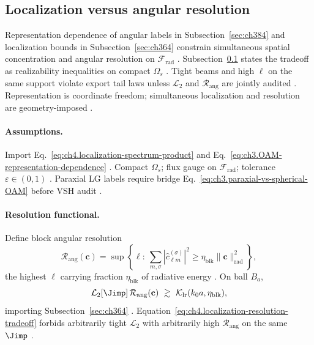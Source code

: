 ﻿\subsection{Localization versus angular resolution}
\label{sec:ch474}

Representation dependence of angular labels in Subsection~\ref{sec:ch384} and localization bounds in Subsection~\ref{sec:ch364} constrain
simultaneous spatial concentration and angular resolution on \(\mathcal{F}_{\mathrm{rad}}\) \cite{harrington2001,hansen1988,stratton1941}.
Subsection~\ref{sec:ch474} states the tradeoff as realizability inequalities on compact \(\Omega_{s}\) \cite{devaney2004,jackson1999}. Tight beams
and high \(\ell\) on the same support violate export tail laws unless \(\mathcal{L}_{2}\) and \(\mathcal{R}_{\mathrm{ang}}\) are jointly audited
\cite{hansen1988,harrington2001}. Representation is coordinate freedom; simultaneous localization and resolution are geometry-imposed
\cite{stratton1941,devaney2004}.

\paragraph{Assumptions.}
Import Eq.~\eqref{eq:ch4.localization-spectrum-product} and Eq.~\eqref{eq:ch3.OAM-representation-dependence} \cite{stratton1941,hansen1988,harrington2001}.
Compact \(\Omega_{s}\); flux gauge on \(\mathcal{F}_{\mathrm{rad}}\); tolerance \(\varepsilon\in(0,1)\) \cite{jackson1999,devaney2004}. Paraxial LG
labels require bridge Eq.~\eqref{eq:ch3.paraxial-vs-spherical-OAM} before VSH audit \cite{harrington2001,allen1992}.

\paragraph{Resolution functional.}
Define block angular resolution
\begin{equation}
\label{eq:ch4.angular-resolution-functional}
\mathcal{R}_{\mathrm{ang}}(\mathbf{c})=\sup\left\{\ell:\ \sum_{m,\sigma}|\widehat{c}_{\ell m}^{(\sigma)}|^{2}\ge\eta_{\mathrm{blk}}\|\mathbf{c}\|_{\mathrm{rad}}^{2}\right\},
\end{equation}
the highest \(\ell\) carrying fraction \(\eta_{\mathrm{blk}}\) of radiative energy \cite{hansen1988,harrington2001,stratton1941}. On ball \(B_{a}\),
\begin{equation}
\label{eq:ch4.localization-resolution-tradeoff}
\mathcal{L}_{2}[\Jimp]\,\mathcal{R}_{\mathrm{ang}}(\mathbf{c})\ \gtrsim\ \mathcal{K}_{\mathrm{lr}}(k_{0}a,\eta_{\mathrm{blk}}),
\end{equation}
importing Subsection~\ref{sec:ch364} \cite{jackson1999,hansen1988,devaney2004}. Equation~\eqref{eq:ch4.localization-resolution-tradeoff} forbids
arbitrarily tight \(\mathcal{L}_{2}\) with arbitrarily high \(\mathcal{R}_{\mathrm{ang}}\) on the same \(\Jimp\) \cite{stratton1941,harrington2001}.

